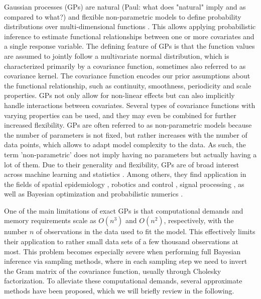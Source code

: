 \documentclass[]{interact}
\theoremstyle{plain}%
\theoremstyle{definition}
\theoremstyle{remark}
\begin{document}
Gaussian processes (GPs) are natural (Paul: what does "natural" imply and as compared to what?) and flexible non-parametric models to define probability distributions over multi-dimensional functions \citep{rasmussen2006gaussian,neal1997monte}. This allows applying probabilistic inference to estimate functional relationships between one or more covariates and a single response variable. The defining feature of GPs is that the function values are assumed to jointly follow a multivariate normal distribution, which is characterized primarily by a covariance function, sometimes also referred to as covariance kernel. The covariance function encodes our prior assumptions about the functional relationship, such as continuity, smoothness, periodicity and scale properties. GPs not only allow for non-linear effects but can also implicitly handle interactions between covariates. Several types of covariance functions with varying properties can be used, and they may even be combined for further increased flexibility. GPs are often referred to as non-parametric models because the number of parameters is not fixed, but rather increases with the number of data points, which allows to adapt model complexity to the data. As such, the term 'non-parametric' does not imply having no parameters but actually having a lot of them. Due to their generality and flexibility, GPs are of broad interest across machine learning and statistics \citep{rasmussen2006gaussian,neal1997monte}. Among others, they find application in the fields of spatial epidemiology \citep{diggle2013statistical,carlin2014hierarchical}, robotics and control \citep{deisenroth2015gaussian}, signal processing \citep{sarkka2013spatiotemporal}, as well as Bayesian optimization and probabilistic numerics \citep{roberts2010bayesian,briol2015probabilistic,hennig2015probabilistic}.

One of the main limitations of exact GPs is that computational demands and memory requirements scale as $O(n^3)$ and $O(n^2)$, respectively, with the number $n$ of observations in the data used to fit the model. This effectively limits their application to rather small data sets of a few thousand observations at most. This problem becomes especially severe when performing full Bayesian inference via sampling methods, where in each sampling step we need to invert the Gram matrix of the covariance function, usually through Cholesky factorization. To alleviate these computational demands, several approximate methods have been proposed, which we will briefly review in the following. 
\end{document}
